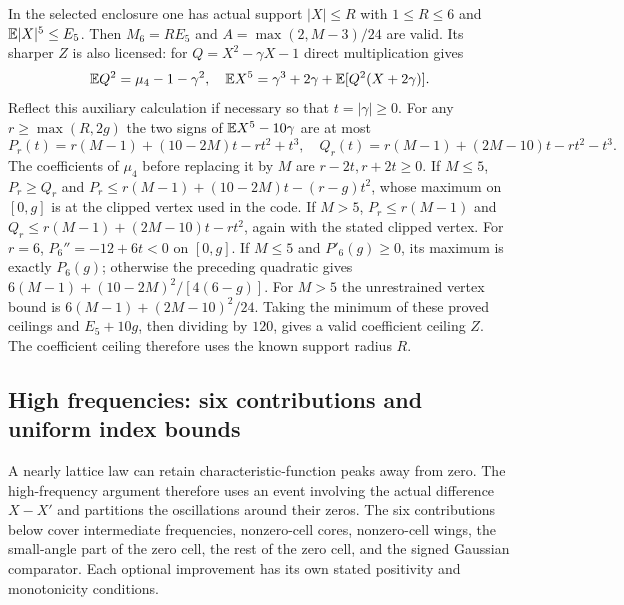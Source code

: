 In the selected enclosure one has actual support $|X|\le R$
with $1\le R\le6$ and $\mathbb E|X|^5\le E_5$. Then $M_6=RE_5$ and
$A=\max(2,M-3)/24$ are valid. Its sharper $Z$ is also licensed:
for $Q=X^2-\gamma X-1$ direct multiplication gives
\[
 \mathbb E Q^2=\mu_4-1-\gamma^2,\quad
 \mathbb E X^5=\gamma^3+2\gamma+\mathbb E[Q^2(X+2\gamma)].
\]
Reflect this auxiliary calculation if necessary so that
$t=|\gamma|\ge0$. For any $r\ge\max(R,2g)$ the two signs of
$\mathbb E X^5-10\gamma$ are at most
\[
 P_r(t)=r(M-1)+(10-2M)t-rt^2+t^3,
 \quad Q_r(t)=r(M-1)+(2M-10)t-rt^2-t^3.
\]
The coefficients of $\mu_4$ before replacing it by $M$ are
$r-2t,r+2t\ge0$. If $M\le5$, $P_r\ge Q_r$ and
$P_r\le r(M-1)+(10-2M)t-(r-g)t^2$, whose maximum on $[0,g]$
is at the clipped vertex used in the code. If $M>5$,
$P_r\le r(M-1)$ and
$Q_r\le r(M-1)+(2M-10)t-rt^2$, again with the stated clipped vertex.
For $r=6$, $P_6''=-12+6t<0$ on $[0,g]$. If $M\le5$ and
$P'_6(g)\ge0$, its maximum is exactly $P_6(g)$; otherwise the
preceding quadratic gives $6(M-1)+(10-2M)^2/[4(6-g)]$.
For $M>5$ the unrestrained vertex bound is
$6(M-1)+(2M-10)^2/24$. Taking the minimum of these proved ceilings
and $E_5+10g$, then dividing by $120$, gives a valid coefficient ceiling $Z$.
The coefficient ceiling therefore uses the known support radius $R$.

\subsection{High frequencies: six contributions and uniform index bounds}

A nearly lattice law can retain characteristic-function peaks away from
zero. The high-frequency argument therefore uses an event involving the
actual difference $X-X'$ and partitions the oscillations around their
zeros. The six contributions below cover intermediate frequencies,
nonzero-cell cores, nonzero-cell wings, the small-angle part of the zero
cell, the rest of the zero cell, and the signed Gaussian comparator.
Each optional improvement has its own stated positivity and monotonicity
conditions.


